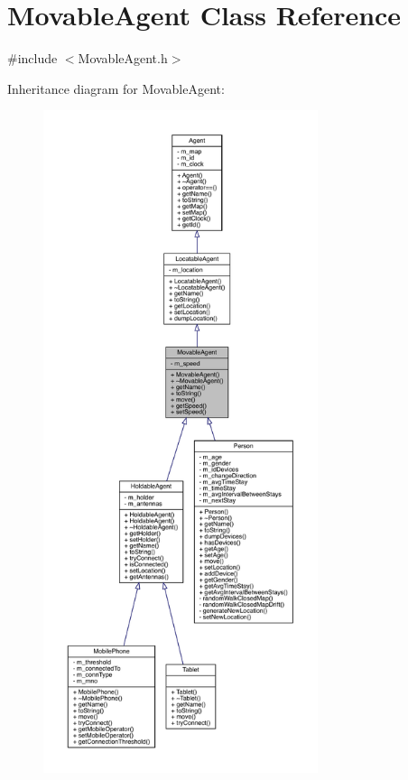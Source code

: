 \hypertarget{class_movable_agent}{}\section{Movable\+Agent Class Reference}
\label{class_movable_agent}


{\ttfamily \#include $<$Movable\+Agent.\+h$>$}



Inheritance diagram for Movable\+Agent\+:
\nopagebreak
\begin{figure}[H]
\begin{center}
\leavevmode
\includegraphics[height=550pt]{class_movable_agent__inherit__graph}
\end{center}
\end{figure}


